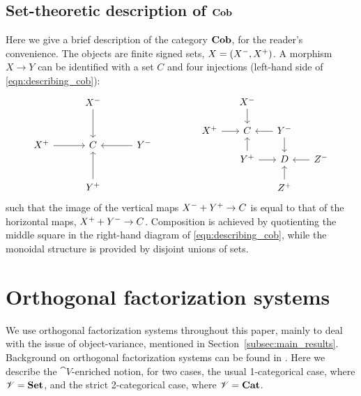 \documentclass[11pt,oneside,article]{memoir}
\begin{document}
\subsection{Set-theoretic description of $\mathbf{Cob}$}

Here we give a brief description of the category $\mathbf{Cob}$, for the reader's convenience. The objects
are finite signed sets, $X=(X^-,X^+)$. A morphism $X\to Y$ can be identified with a set $C$
and four injections (left-hand side of \eqref{eqn:describing_cob}):
\begin{equation}\label{eqn:describing_cob}
\begin{tikzcd}[row sep=1cm, column sep = 1cm]
   &\inp{X}\ar[d]\\
   \outp{X}\ar[r]&C&\inp{Y}\ar[l]\\
   &\outp{Y}\ar[u]
\end{tikzcd}
\hspace{.6in}
\begin{tikzcd}[row sep=.5cm, column sep =.5cm]
   &\inp{X}\ar[d]\\
   \outp{X}\ar[r]&C&\inp{Y}\ar[l]\ar[d]\\
   &\outp{Y}\ar[u]\ar[r]&D&\inp{Z}\ar[l]\\
   &&\outp{Z}\ar[u]
\end{tikzcd}
\end{equation}
such that the image of the vertical maps $X^-+Y^+\to C$ is equal to that of the horizontal
maps, $X^++Y^-\to C$. Composition is achieved by quotienting the middle square in the
right-hand diagram of \eqref{eqn:describing_cob}, while the monoidal structure is provided by
disjoint unions of sets.

\section{Orthogonal factorization systems}

We use orthogonal factorization systems throughout this paper, mainly to deal with the issue of
object-variance, mentioned in Section~\ref{subsec:main_results}. Background on orthogonal
factorization systems can be found in \cite[Chapter 5.5]{BorceuxV1}. Here we describe the
$\cat{V}$-enriched notion, for two cases, the usual 1-categorical case, where $\mathscr{V}=\mathbf{Set}$, and
the strict 2-categorical case, where $\mathscr{V}=\mathbf{Cat}$.
\end{document}
